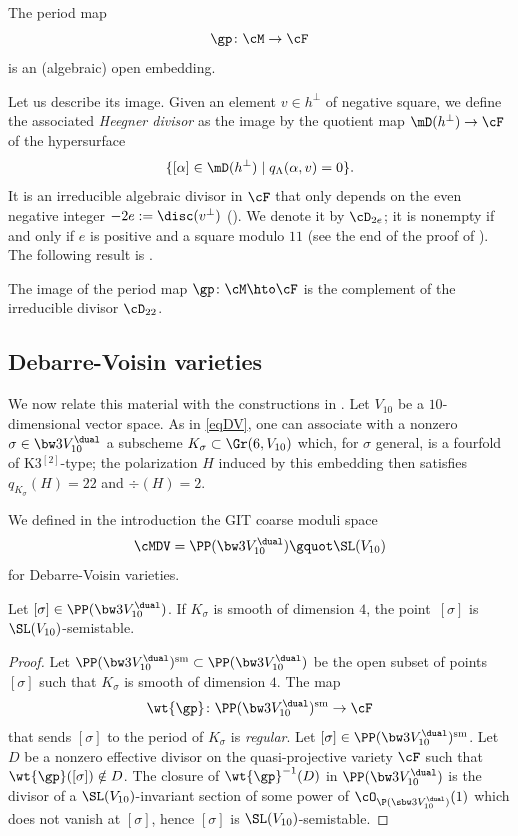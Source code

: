 \begin{theo}\label{torth}
The period map
\[
\gp\colon \cM\to \cF
\] is an (algebraic) open embedding.
\end{theo}

Let us describe its image. Given an element $v\in h^\bot$ of negative square, we define the associated \emph{Heegner divisor}
as the image by the quotient map $ \mD(h^\bot)\to\cF$ of the hypersurface
\[
\{[\alpha]\in \mD(h^\bot) \mid q_\Lambda(\alpha, v ) =0\}.
\]
It is an irreducible algebraic divisor in $\cF$ that only depends on the even
negative integer $-2e:=\disc(v^\bot)$ (\cite[Prop.\,4.1(2)(c)]{dm}). We
denote it by $\cD_{2e}$; it is nonempty if and only if $e$ is positive and a
square modulo $11$ (see the end of the proof of \cite[Prop.\,4.1]{dm}). The following result is \cite[Th.\,6.1]{dm}.

\begin{prop}\label{image}
The image of the period map
$\gp\colon \cM\hto \cF
$ is the complement of the irreducible divisor $\cD_{22}$.
\end{prop}

\subsection{Debarre-Voisin varieties}

We now relate this material with the constructions in \cite{devo}. Let $V_{10}$ be a $10$-dimensional vector space. As in \eqref{eqDV}, one can associate with a nonzero
$\sigma\in \bw3V_{10}^\dual$ a subscheme $K_\sigma\subset \Gr(6,V_{10})$ which, for $\sigma$ general, is a
\hk fourfold of K3$^{[2]}$-type; the polarization $H$ induced by this embedding then satisfies $q_{K_\sigma}(H)=22$ and $\div(H)=2$.

We defined in the introduction
the GIT
coarse moduli space
\[
\cMDV=\PP(\bw3 V_{10}^\dual) \gquot \SL(V_{10})
\]
for Debarre-Voisin varieties.

\begin{prop}
Let $[\sigma]\in \PP(\bw3 V_{10}^\dual)$. If $K_{\sigma}$ is smooth of dimension $4$,
the point~$[\sigma]$ is $\SL(V_{10})$-semistable.
\end{prop}

\begin{proof}
Let $\PP(\bw3 V_{10}^\dual)^{\textnormal{sm}}\subset \PP(\bw3 V_{10}^\dual)$ be the open subset of points $[\sigma]$ such that $K_{\sigma}$ is smooth of dimension $4$. The map
\[
\wt{\gp}\colon \PP(\bw3 V_{10}^\dual)^{\textnormal{sm}}
\to \cF
\]
that sends $[\sigma]$ to the period of $K_\sigma$ is \emph{regular}.
Let $[\sigma]\in \PP(\bw3 V_{10}^\dual)^{\textnormal{sm}}$.
Let $D$ be a nonzero effective divisor on the quasi-projective variety $\cF $ such that
$\wt{\gp}([\sigma])\notin D$.
The closure of $ {\wt{\gp}^{-1}(D)}$ in $\PP(\bw3 V_{10}^\dual)$ is the divisor of a $\SL(V_{10})$-invariant section of some power of $\cO_{\P(\sbw3 V_{10}^\dual)}(1)$ which does not vanish at $[\sigma]$, hence $[\sigma]$ is $\SL(V_{10})$-semistable.
\end{proof}

